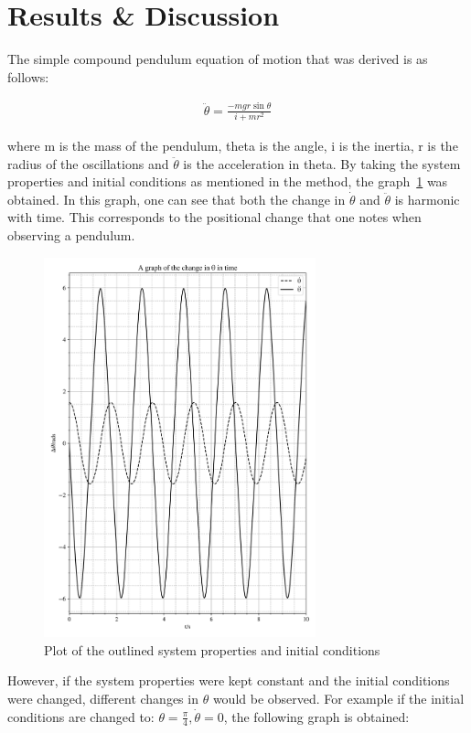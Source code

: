 \documentclass[12pt, a4paper]{article}
\begin{document}
\section{Results \& Discussion}
The simple compound pendulum equation of motion that was derived is as follows:

\begin{align}
    \ddot{\theta} = \frac{-mgr\sin \theta}{i+mr^2}
\end{align}

where m is the mass of the pendulum, theta is the angle, i is the inertia, r is the radius of the oscillations and \(\ddot{\theta}\) is the acceleration in theta. By taking the system properties and initial conditions as mentioned in the method, the graph~\ref{fig: pendulum 1.1} was obtained. In this graph, one can see that both the change in \(\dot{\theta}\) and \(\ddot{\theta}\) is harmonic with time. This corresponds to the positional change that one notes when observing a pendulum.

\begin{figure}[H]
    \centering
    \includegraphics[width = 0.7\textwidth]{plots/Plot 1.1.png}\caption{Plot of the outlined system properties and initial conditions}\label{fig: pendulum 1.1}
\end{figure}

However, if the system properties were kept constant and the initial conditions were changed, different changes in \(\theta\) would be observed. For example if the initial conditions are changed to: \(\theta = \frac{\pi}{4}, \dot{\theta} = 0\), the following graph is obtained:
\end{document}
